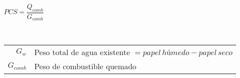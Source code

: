\documentclass[11pt,a4paper]{article}
\begin{document}
\begin{cajita}
\begin{multicols}{2}
			$PCS = \dfrac{Q_{comb}}{G_{comb}}$\\[.1cm]
			
				\columnbreak
			
			\\[.1cm]
			\vspace{.3cm}
		
			
			\begin{tabular}{r p{.7\linewidth}}
				$G_w$ & Peso total de agua existente $= papel\,húmedo - papel\, seco$\\
				$G_{comb}$ & Peso de combustible quemado\\
			\end{tabular}
		\end{multicols}
		
	\end{cajita}
	
\end{document}
